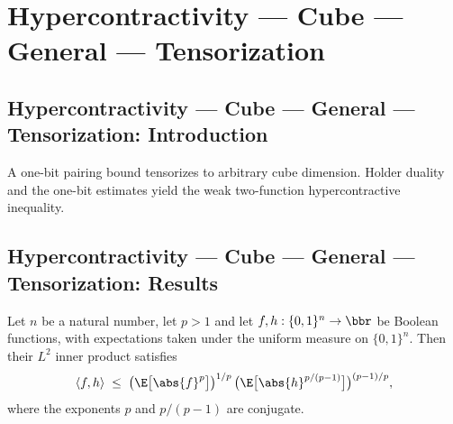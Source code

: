 \section{Hypercontractivity --- Cube --- General --- Tensorization}
\subsection*{Hypercontractivity --- Cube --- General --- Tensorization: Introduction}
A one-bit pairing bound tensorizes to arbitrary cube dimension. Holder duality and the one-bit estimates yield the weak two-function hypercontractive inequality.

\subsection*{Hypercontractivity --- Cube --- General --- Tensorization: Results}

\begin{lemma}
\leanok
{}
\label{BooleanAnalysis.Hypercontractivity.holder_ineq_bool}
Let $n$ be a natural number, let $p > 1$ and let $f, h : \{0,1\}^n \to \bbr$ be Boolean
functions, with expectations
taken under the uniform measure on $\{0,1\}^n$. Then their $L^2$ inner product satisfies
\[
  \langle f, h\rangle \;\le\; \bigl(\E\bigl[\abs{f}^{p}\bigr]\bigr)^{1/p}\,
  \bigl(\E\bigl[\abs{h}^{p/(p-1)}\bigr]\bigr)^{(p-1)/p},
\]
where the exponents $p$ and $p/(p-1)$ are conjugate.
\end{lemma}

